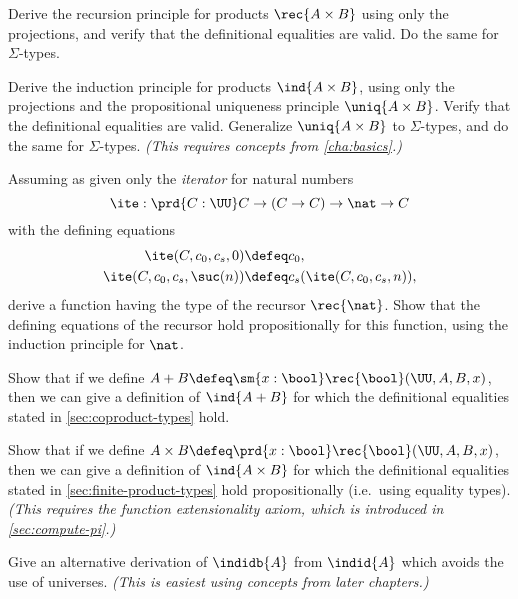 \begin{ex}\label{ex:pr-to-rec}
  Derive the recursion principle for products $\rec{A\times B} $ using only the projections, and verify that the definitional equalities are valid.
  Do the same for $\Sigma$-types.
\end{ex}

\begin{ex}\label{ex:pr-to-ind}
  Derive the induction principle for products $\ind{A\times B}$, using only the projections and the propositional uniqueness principle $\uniq{A\times B}$.
  Verify that the definitional equalities are valid.
  Generalize $\uniq{A\times B}$ to $\Sigma$-types, and do the same for $\Sigma$-types.
  \emph{(This requires concepts from \cref{cha:basics}.)}
\end{ex}

\begin{ex}\label{ex:iterator}
Assuming as given only the \emph{iterator} for natural numbers
\[\ite : \prd{C:\UU} C \to (C \to C) \to \nat \to C \]
with the defining equations
\begin{align*}
\ite(C,c_0,c_s,0)  &\defeq c_0, \\
\ite(C,c_0,c_s,\suc(n)) &\defeq c_s(\ite(C,c_0,c_s,n)),
\end{align*}
derive a function having the type of the recursor $\rec{\nat}$.
Show that the defining equations of the recursor hold propositionally for this function, using the induction principle for $\nat$.
\end{ex}

\begin{ex}\label{ex:sum-via-bool}
%
Show that if we define $A + B \defeq \sm{x:\bool} \rec{\bool}(\UU,A,B,x)$, then we can give a definition of $\ind{A+B}$ for which the definitional equalities stated in \cref{sec:coproduct-types} hold.
\end{ex}

\begin{ex}\label{ex:prod-via-bool}
%
Show that if we define $A \times B \defeq \prd{x:\bool}\rec{\bool}(\UU,A,B,x)$, then we can give a definition of  $\ind{A\times B}$ for which the definitional equalities stated in \cref{sec:finite-product-types} hold propositionally (i.e.\ using equality types).
\emph{(This requires the function extensionality axiom, which is introduced in \cref{sec:compute-pi}.)}
\end{ex}

\begin{ex}\label{ex:pm-to-ml}
Give an alternative derivation of $\indidb{A}$ from $\indid{A}$ which avoids the use of universes.
  \emph{(This is easiest using concepts from later chapters.)}
\end{ex}

